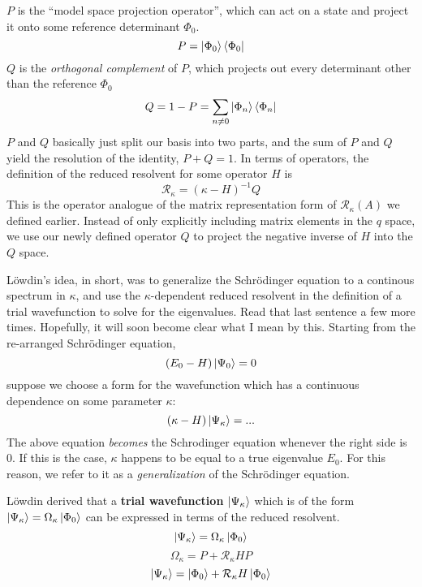 \documentclass{article}
\begin{document}
$P$ is the ``model space projection operator'', which can act on a state 
    and project it onto some reference determinant $\Phi_0$.
\[P = \ket{\Phi_0}\bra{\Phi_0}  \]
$Q$ is the \textit{orthogonal complement} of $P$, which projects out every determinant other than the reference $\Phi_0$
\[Q = 1 - P = \sum_{n \neq 0}  \ket{\Phi_n}\bra{\Phi_n}\]
$P$ and $Q$ basically just split our basis into two parts, and the sum of $P$ and $Q$ yield the resolution of the identity, $P + Q = 1$.
In terms of operators, the definition of the reduced resolvent for some operator $H$ is
\[\mathcal{R}_{\kappa} = (\kappa - H)^{-1} Q  \]
This is the operator analogue of the matrix representation form of $\mathcal{R}_{\kappa}(A)$
we defined earlier. Instead of only explicitly including matrix elements in the $q$ space, 
we use our newly defined operator $Q$ to project the negative inverse of $H$ into the $Q$ space.


L{\"o}wdin's idea, in short, was to generalize the Schr{\"o}dinger equation
to a continous spectrum in $\kappa$, and use the $\kappa$-dependent reduced resolvent in the definition of 
a trial wavefunction to solve for the eigenvalues. Read that last sentence a few more times. 
Hopefully, it will soon become clear what I mean by this.
Starting from the re-arranged Schr{\"o}dinger equation,
\[(E_0 - H) \ket{\Psi_0} = 0 \]
suppose we choose a form for the wavefunction which has a continuous dependence on some parameter
$\kappa$: 
\[(\kappa - H) \ket{\Psi_{\kappa}} = ... \]
The above equation \textit{becomes} the Schrodinger equation whenever the right side is 0.
If this is the case, $\kappa$ happens to be equal to a true eigenvalue $E_0$.
For this reason, we refer to it as a \textit{generalization} of the Schr{\"o}dinger equation.

L{\"o}wdin derived that a \textbf{trial wavefunction} $\ket{\Psi_{\kappa}}$ 
    which is of the form $\ket{\Psi_\kappa} = \Omega_\kappa \ket{\Phi_0}$
    can be expressed in terms of the reduced resolvent. 
\[\ket{\Psi_\kappa} = \Omega_\kappa \ket{\Phi_0}\]
\[\Omega_{\kappa} = P + \mathcal{R}_{\kappa} H P \]
\[\ket{\Psi_{\kappa}} = \ket{\Phi_0} + \mathcal{R}_{\kappa} H \ket{\Phi_0} \]
\end{document}
